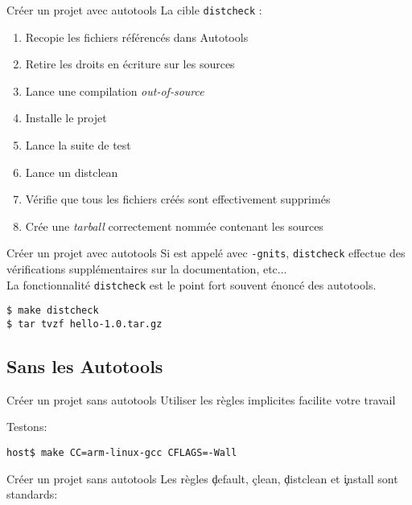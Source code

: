 \begin{frame}[fragile=singleslide]{Créer un projet avec autotools}
  La cible \verb+distcheck+ :
  \begin{enumerate}
  \item Recopie les fichiers référencés dans Autotools
  \item Retire les droits en écriture sur les sources
  \item Lance une compilation \emph{out-of-source}
  \item Installe le projet
  \item Lance la suite de test
  \item Lance un distclean
  \item Vérifie que tous les fichiers créés sont effectivement supprimés
  \item Crée une \emph{tarball} correctement nommée contenant les sources
  \end{enumerate}
\end{frame}

\begin{frame}[fragile=singleslide]{Créer un projet avec autotools}
  Si   est appelé avec  \verb+-gnits+, \verb+distcheck+
  effectue des vérifications supplémentaires sur la documentation,
  etc...
  \\[2ex]
  La fonctionnalité \verb+distcheck+ est  le point fort souvent énoncé
  des autotools.
\begin{lstlisting}
$ make distcheck
$ tar tvzf hello-1.0.tar.gz
\end{lstlisting} %
\end{frame}

\subsection{Sans les Autotools}

\begin{frame}[fragile=singleslide]{Créer un projet sans autotools}
  Utiliser les règles implicites facilite votre travail
  
  Testons:
\begin{lstlisting}
host$ make CC=arm-linux-gcc CFLAGS=-Wall
\end{lstlisting} %
\end{frame}

\begin{frame}[fragile=singleslide]{Créer un projet sans autotools}
  Les règles \c{default}, \c{clean}, \c{distclean} et \c{install} sont
  standards:
  
\end{frame}

